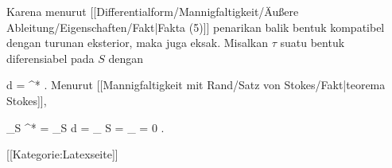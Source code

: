 Karena menurut
[[Differentialform/Mannigfaltigkeit/Äußere Ableitung/Eigenschaften/Fakt|Fakta (5)]]
penarikan balik bentuk kompatibel dengan turunan eksterior, maka
\mathl{\varphi^*\omega}{} juga eksak. Misalkan $\tau$ suatu bentuk diferensiabel pada $S$ dengan

\mavergleichskettedisp
{\vergleichskette
{d \tau
}
{ =} { \varphi^* \omega
}
{ } {
}
{ } {
}
{ } {
}
}
{}{}{.}
Menurut
[[Mannigfaltigkeit mit Rand/Satz von Stokes/Fakt|teorema Stokes]],

\mavergleichskettedisp
{\vergleichskette
{ \int_S \varphi^* \omega
}
{ =} { \int_S d \tau
}
{ =} { \int_{ \partial S } \tau
}
{ =} { \int_\emptyset \tau
}
{ =} { 0
}
}
{}{}{.}

 [[Kategorie:Latexseite]]
